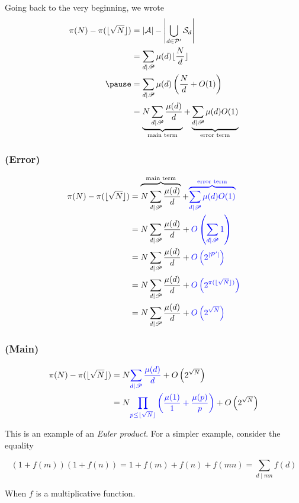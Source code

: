 
\begin{frame}\frametitle{\insertsubsection}
Going back to the very beginning, we wrote
\begin{align*}
  \pi(N) - \pi(\lfloor\sqrt{N}\rfloor)
  &= |\mathcal{A}| - \left|\bigcup_{d \in \mathcal{P}'} \mathcal{S}_d\right| \\
  &= \sum_{d \mid \mathscr{P}} \mu(d) \lfloor\frac{N}{d}\rfloor \\
  \pause
  &= \sum_{d \mid \mathscr{P}} \mu(d) \left(\frac{N}{d} + O(1)\right) \\
  &= \underbrace{N \sum_{d \mid \mathscr{P}} \frac{\mu(d)}{d}}_{\text{main term}} + \underbrace{\sum_{d \mid \mathscr{P}} \mu(d) O(1)}_{\text{error term}}
\end{align*}
\end{frame}

\begin{frame}\frametitle{\insertsubsection (Error)}
\begin{align*}
  \pi(N) - \pi(\lfloor\sqrt{N}\rfloor)
  &= \overbrace{N \sum_{d \mid \mathscr{P}} \frac{\mu(d)}{d}}^{\text{main term}} + {\color{blue} \overbrace{\sum_{d \mid \mathscr{P}} \mu(d) O(1)}^{\text{error term}}} \\
  &= N \sum_{d \mid \mathscr{P}} \frac{\mu(d)}{d} + {\color{blue} O\left(\sum_{d \mid \mathscr{P}} 1\right)} \\
  &= N \sum_{d \mid \mathscr{P}} \frac{\mu(d)}{d} + {\color{blue} O\left(2^{|\mathcal{P}'|}\right)} \\
  &= N \sum_{d \mid \mathscr{P}} \frac{\mu(d)}{d} + {\color{blue} O\left(2^{\pi(\lfloor\sqrt{N}\rfloor)}\right)} \\
  \break
  &= N \sum_{d \mid \mathscr{P}} \frac{\mu(d)}{d} + {\color{blue} O\left(2^{\sqrt{N}}\right)} \\
\end{align*}
\end{frame}

\begin{frame}\frametitle{\insertsubsection (Main)}
\begin{align*}
  \pi(N) - \pi(\lfloor\sqrt{N}\rfloor)
  &= N {\color{blue} \sum_{d \mid \mathscr{P}} \frac{\mu(d)}{d}} + O\left(2^{\sqrt{N}}\right) \\
  &= N {\color{blue} \prod_{p \leq \lfloor\sqrt{N}\rfloor} \left(\frac{\mu(1)}{1} + \frac{\mu(p)}{p}\right)} + O\left(2^{\sqrt{N}}\right)
\end{align*}

This is an example of an \textit{Euler product}. For a simpler example, consider the equality

\[
  (1 + f(m))(1 + f(n)) = 1 + f(m) + f(n) + f(mn) = \sum_{d \mid mn} f(d)
\]

When \(f\) is a multiplicative function.
\end{frame}

